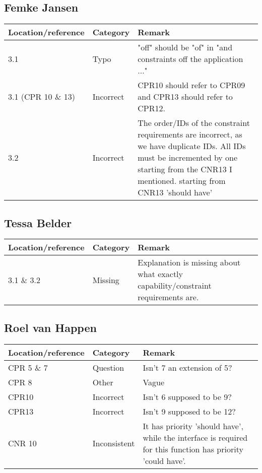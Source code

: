 \subsection*{Femke Jansen}

\begin{tabular}{l|l|p{}}
Location/reference & Category & Remark\\
\hline
\hline
3.1 & Typo & "off" should be "of" in "and constraints off the application ..."\\
3.1 (CPR 10 \& 13) & Incorrect & CPR10 should refer to CPR09 and CPR13 should refer to CPR12.\\
3.2 & Incorrect & The order/IDs of the constraint requirements are incorrect, as we have duplicate IDs. All IDs must be incremented by one starting from the CNR13 I mentioned.
starting from CNR13 'should have'\\

\end{tabular}

\subsection*{Tessa Belder}

\begin{tabular}{l|l|p{}}
Location/reference & Category & Remark\\
\hline
\hline
3.1 \& 3.2 & Missing & Explanation is missing about what exactly capability/constraint requirements are.\\
\end{tabular}

\subsection*{Roel van Happen}

\begin{tabular}{l|l|p{}}
Location/reference & Category & Remark\\
\hline
\hline
CPR 5 \& 7 & Question & Isn't 7 an extension of 5?\\
CPR 8 & Other & Vague\\
CPR10 & Incorrect & Isn't 6 supposed to be 9?\\
CPR13 & Incorrect & Isn't 9 supposed to be 12?\\
CNR 10 & Inconsistent & It has priority 'should have', while the interface is required for this function has priority 'could have'.\\
\end{tabular}

